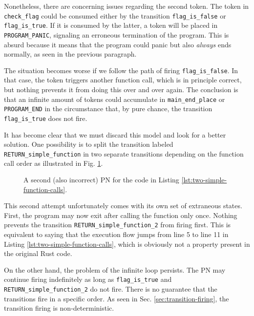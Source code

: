 Nonetheless, there are concerning issues regarding the second token.
The token in \texttt{check\_flag} could be consumed either
by the transition \texttt{flag\_is\_false} or \texttt{flag\_is\_true}.
If it is consumed by the latter, a token will be placed in \texttt{PROGRAM\_PANIC},
signaling an erroneous termination of the program.
This is absurd because it means that the program could panic
but also \emph{always} ends normally, as seen in the previous paragraph.

The situation becomes worse if we follow the path of firing \texttt{flag\_is\_false}.
In that case, the token triggers another function call, which is in principle correct,
but nothing prevents it from doing this over and over again.
The conclusion is that an infinite amount of tokens could accumulate
in \texttt{main\_end\_place} or \texttt{PROGRAM\_END}
in the circumstance that, by pure chance,
the transition \texttt{flag\_is\_true} does not fire.

It has become clear that we must discard this model and look for a better solution.
One possibility is to split the transition labeled \texttt{RETURN\_simple\_function}
in two separate transitions depending on the function call order
as illustrated in Fig. \ref{fig:two-function-calls-incorrect-2}.

\begin{figure}[!htbp]
    \centering
    
    \caption{A second (also incorrect) \acrshort{PN} for the code
        in Listing \ref{lst:two-simple-function-calls}.}
    \label{fig:two-function-calls-incorrect-2}
\end{figure}

This second attempt unfortunately comes with its own set of extraneous states.
First, the program may now exit after calling the function only once.
Nothing prevents the transition \texttt{RETURN\_simple\_function\_2} from firing first.
This is equivalent to saying that the execution flow jumps
from line 5 to line 11 in Listing \ref{lst:two-simple-function-calls},
which is obviously not a property present in the original Rust code.

On the other hand, the problem of the infinite loop persists.
The \acrshort{PN} may continue firing indefinitely as long as
\texttt{flag\_is\_true} and \texttt{RETURN\_simple\_function\_2} do not fire.
There is no guarantee that the transitions fire in a specific order.
As seen in Sec. \ref{sec:transition-firing},
the transition firing is non-deterministic.

